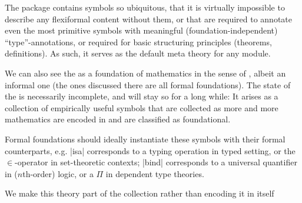 The  package contains \sTeX symbols so ubiquitous, that it is
virtually impossible to describe any flexiformal content without them, or that are
required to annotate even the most primitive symbols with meaningful
(foundation-independent) ``type''-annotations, or required for basic structuring
principles (theorems, definitions). As such, it serves as the default meta theory for any
\sTeX module.

We can also see the  as a foundation of mathematics in the sense of
\cite{rabe:future:15}, albeit an informal one (the ones discussed there are all formal
foundations). The state of the  is necessarily incomplete, and will
stay so for a long while: It arises as a collection of empirically useful symbols that are
collected as more and more mathematics are encoded in \sTeX and are classified as
foundational.

Formal foundations should ideally instantiate these symbols with their formal counterparts,
e.g. |isa| corresponds to a typing operation in typed setting, or the $\in$-operator in
set-theoretic contexts; |bind| corresponds to a universal quantifier in ($n$th-order)
logic, or a $\Pi$ in dependent type theories.

We make this theory part of the \sTeX collection rather than encoding it in \sTeX
itself



